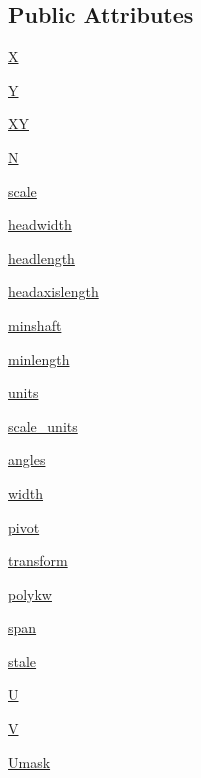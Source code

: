 \subsection*{Public Attributes}
\begin{DoxyCompactItemize}
\item 
\hyperlink{classmatplotlib_1_1quiver_1_1Quiver_abbb67e0a7c1a4129b9aa26e4feaa160c}{X}
\item 
\hyperlink{classmatplotlib_1_1quiver_1_1Quiver_acaf82aff910e4977dd321c3c7533cc1d}{Y}
\item 
\hyperlink{classmatplotlib_1_1quiver_1_1Quiver_a108a54b8f1d7fac1b19e46b45942eb68}{XY}
\item 
\hyperlink{classmatplotlib_1_1quiver_1_1Quiver_ababf47c53044c23aca70a9412974a3c8}{N}
\item 
\hyperlink{classmatplotlib_1_1quiver_1_1Quiver_ad19d68817128173ecff9b52c278398e6}{scale}
\item 
\hyperlink{classmatplotlib_1_1quiver_1_1Quiver_a19f9949aae4a40be8613571cb993ecc7}{headwidth}
\item 
\hyperlink{classmatplotlib_1_1quiver_1_1Quiver_a2b589ea0865f3f79f62be6f2eb3020e8}{headlength}
\item 
\hyperlink{classmatplotlib_1_1quiver_1_1Quiver_a096bdd76c5e18fbab50f1ba1ba86d20f}{headaxislength}
\item 
\hyperlink{classmatplotlib_1_1quiver_1_1Quiver_ab8494be335d6a191390160a70ee5993a}{minshaft}
\item 
\hyperlink{classmatplotlib_1_1quiver_1_1Quiver_ad055632c48288f5957e20394aaa4dadd}{minlength}
\item 
\hyperlink{classmatplotlib_1_1quiver_1_1Quiver_a8161b4d5e462074e7bc03d0927b340d3}{units}
\item 
\hyperlink{classmatplotlib_1_1quiver_1_1Quiver_a77b683fa90568c01daa48255549f7df3}{scale\+\_\+units}
\item 
\hyperlink{classmatplotlib_1_1quiver_1_1Quiver_a7992830d6364ca79bd57bf6152486ad3}{angles}
\item 
\hyperlink{classmatplotlib_1_1quiver_1_1Quiver_a75d5ada927ce226d1e4660ec95b2bf75}{width}
\item 
\hyperlink{classmatplotlib_1_1quiver_1_1Quiver_a75cec728016eb0e4cb1d97a8bbb80e95}{pivot}
\item 
\hyperlink{classmatplotlib_1_1quiver_1_1Quiver_afa19ba350178b7d434d58a87b93a6640}{transform}
\item 
\hyperlink{classmatplotlib_1_1quiver_1_1Quiver_a5572b1703a59a2383de962c653cc0468}{polykw}
\item 
\hyperlink{classmatplotlib_1_1quiver_1_1Quiver_a67b02c984a80b24622bcf449f8bdf8e1}{span}
\item 
\hyperlink{classmatplotlib_1_1quiver_1_1Quiver_af5ed6a718c65bf73a7613f3e41d81104}{stale}
\item 
\hyperlink{classmatplotlib_1_1quiver_1_1Quiver_af99b7eb713d591fc05bc8747234fe1ba}{U}
\item 
\hyperlink{classmatplotlib_1_1quiver_1_1Quiver_a8374c536876a49808765bc6eef6114a7}{V}
\item 
\hyperlink{classmatplotlib_1_1quiver_1_1Quiver_a2090d5ea405301c5511c95c98f97fc92}{Umask}
\end{DoxyCompactItemize}
